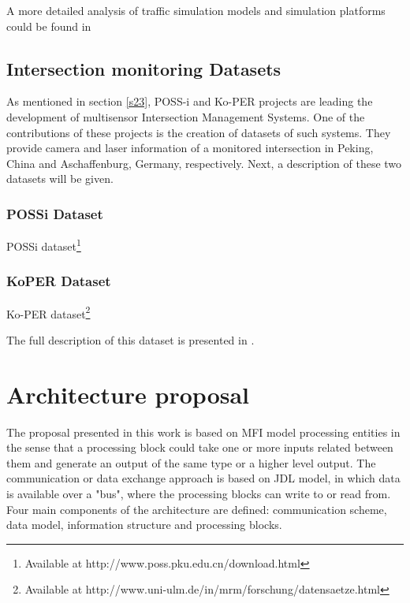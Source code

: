 
A more detailed analysis of traffic simulation models and simulation platforms could be found in \cite{AdamsBoxill2000, Barcelo2000, Kitamura2005, Lieberman1992}




\subsection{Intersection monitoring Datasets}

As mentioned in section \ref{s23}, POSS-i and Ko-PER projects are leading the development of multisensor Intersection Management Systems. One of the contributions of these projects is the creation of datasets of such systems. They provide camera and laser information of a monitored intersection in Peking, China and Aschaffenburg, Germany, respectively. Next, a description of these two datasets will be given.

\subsubsection{POSSi Dataset }

POSSi dataset\footnote{Available at http://www.poss.pku.edu.cn/download.html}


\subsubsection{KoPER Dataset }

Ko-PER dataset\footnote{Available at http://www.uni-ulm.de/in/mrm/forschung/datensaetze.html}

The full description of this dataset is presented in \cite{Strigel2014}.

\section{Architecture proposal}

The proposal presented in this work is based on MFI model processing entities in the sense that a processing block could take one or more inputs related between them and generate an output of the same type or a higher level output. The communication or data exchange approach is based on JDL model, in which data is available over a "bus", where the processing blocks can write to or read from. Four main components of the architecture are defined: communication scheme, data model, information structure and processing blocks. 



